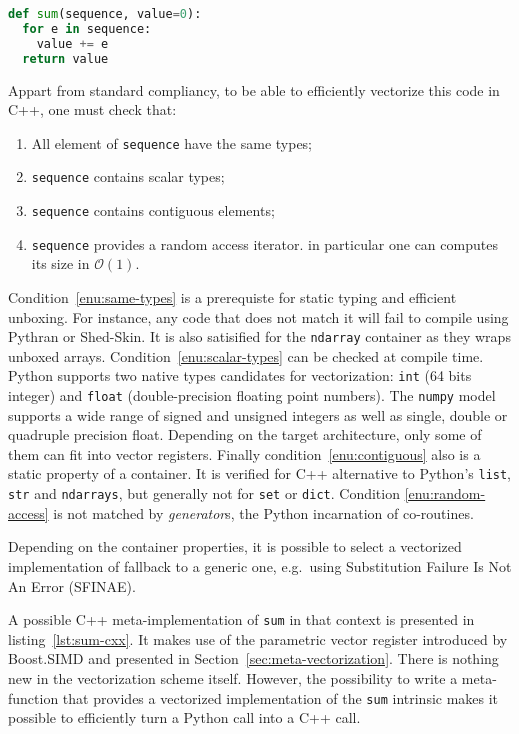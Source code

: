 \documentclass[preprint]{sigplanconf}
\begin{document}
\begin{lstlisting}[language=python, label={lst:sum-py}, caption={Pseudo code of the \texttt{sum} intrinsic.}]
def sum(sequence, value=0):
  for e in sequence:
    value += e
  return value
\end{lstlisting}


Appart from standard compliancy, to be able to efficiently vectorize this code in C++, one must check that:

\begin{enumerate}
    \item\label{enu:same-types} All element of \texttt{sequence} have the same types;
    \item\label{enu:scalar-types} \texttt{sequence} contains scalar types;
    \item\label{enu:contiguous} \texttt{sequence} contains contiguous elements;
    \item\label{enu:random-access} \texttt{sequence} provides a random access iterator. in particular one can computes its size in $\mathcal{O}(1)$.
\end{enumerate}

Condition~\ref{enu:same-types} is a prerequiste for static typing and efficient
unboxing. For instance, any code that does not match it will fail to compile
using Pythran or Shed-Skin. It is also satisified for the \texttt{ndarray}
container as they wraps unboxed arrays. Condition~\ref{enu:scalar-types} can be
checked at compile time. Python supports two native types candidates for
vectorization: \texttt{int} (64 bits integer) and \texttt{float}
(double-precision floating point numbers). The \texttt{numpy} model supports a
wide range of signed and unsigned integers as well as single, double or
quadruple precision float. Depending on the target architecture, only some of
them can fit into vector registers. Finally condition~\ref{enu:contiguous} also
is a static property of a container. It is verified for C++ alternative to
Python's \texttt{list}, \texttt{str} and \texttt{ndarrays}, but generally not
for \texttt{set} or \texttt{dict}. Condition \ref{enu:random-access} is not
matched by \emph{generator}s, the Python incarnation of co-routines.

Depending on the container properties, it is possible to select a vectorized
implementation of fallback to a generic one, e.g.\ using Substitution Failure
Is Not An Error (SFINAE).

A possible C++ meta-implementation of \texttt{sum} in that context is presented
in listing~\ref{lst:sum-cxx}. It makes use of the parametric vector register
introduced by Boost.SIMD and presented in Section~\ref{sec:meta-vectorization}.
There is nothing new in the vectorization scheme itself. However, the
possibility to write a meta-function that provides a vectorized implementation
of the \texttt{sum} intrinsic makes it possible to efficiently turn a Python
call into a C++ call.
\end{document}
